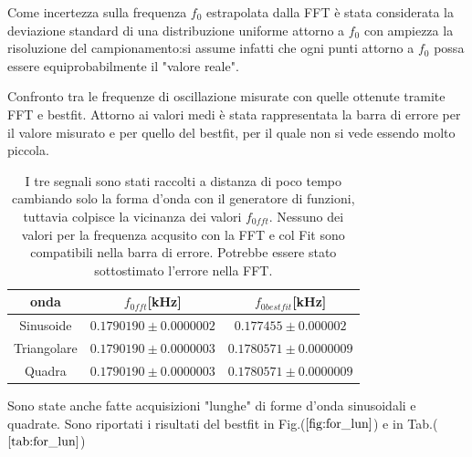 \documentclass{article}
\begin{document}
        Come incertezza sulla frequenza $f_0$ estrapolata dalla FFT è stata 
        considerata la deviazione standard di una distribuzione uniforme attorno
        a $f_0$ con ampiezza la risoluzione del campionamento:si assume infatti
         che ogni punti attorno a $f_0$ possa essere equiprobabilmente il "valore reale".  
         

        \begin{table}[H]
            \centering
            \caption{Confronto tra le frequenze di oscillazione misurate con quelle ottenute tramite FFT e bestfit.
                    Attorno ai valori medi è stata rappresentata la barra di errore per il valore
                    misurato e per quello del bestfit, per il quale non si vede essendo molto piccola.}
                \begin{tabular}{ccc}
                    onda            &   $f_{0fft}$[kHz]                     & $f_{0bestfit}$[kHz] \\
                    \hline
                    Sinusoide       &   $0.1790190 \pm 0.0000002$           & $0.177455 \pm 0.000002$ \\
                    Triangolare     &   $0.1790190 \pm 0.0000003$           & $0.1780571\pm 0.0000009$ \\
                    Quadra          &   $0.1790190 \pm 0.0000003$           & $0.1780571 \pm 0.0000009$ \\
                \end{tabular}
                \caption{I tre segnali sono stati raccolti a distanza di poco tempo
                        cambiando solo la forma d'onda con il generatore di funzioni,
                        tuttavia colpisce la vicinanza dei valori $f_{0fft}$.
                        Nessuno dei valori per la frequenza acqusito con la FFT
                        e col Fit sono compatibili nella barra di errore.
                        Potrebbe essere stato sottostimato l'errore nella FFT.}
                \label{tab:for_ond}
        \end{table}

        Sono state anche fatte acquisizioni "lunghe" di forme d'onda sinusoidali
         e quadrate. Sono riportati i risultati del bestfit in Fig.($\ref{fig:for_lun}$)
         e in Tab.($\ref{tab:for_lun}$)

         
\end{document}
